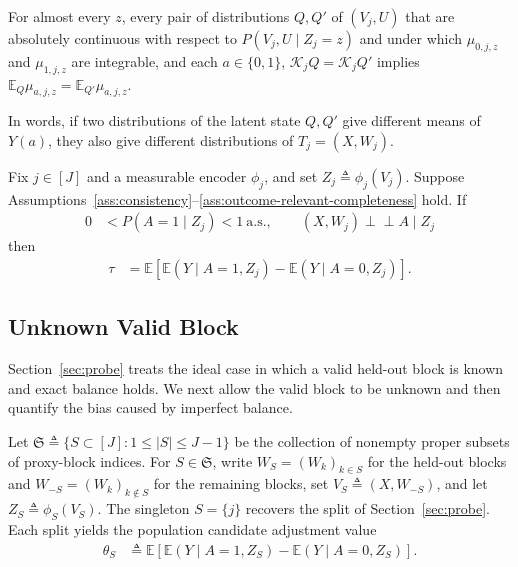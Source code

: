 \begin{assumption}
\label{ass:outcome-relevant-completeness}
For almost every $z$, every pair of distributions $Q,Q'$ of $(V_j,U)$ that are absolutely continuous with respect to $P(V_j,U\mid Z_j=z)$ and under which $\mu_{0,j,z}$ and $\mu_{1,j,z}$ are integrable, and each $a\in\{0,1\}$, $\mathcal K_jQ=\mathcal K_jQ'$ implies $\mathbb E_Q\mu_{a,j,z}=\mathbb E_{Q'}\mu_{a,j,z}$.
\end{assumption}

 In words, if two distributions of the latent state $Q,Q'$ give different means of $Y(a)$, they also give different distributions of $T_j=(X,W_j)$.

\begin{theorem}
\label{thm:exact-proxy-identification}
Fix $j\in[J]$ and a measurable encoder $\phi_j$, and set $Z_j\triangleq\phi_j(V_j)$. Suppose Assumptions~\ref{ass:consistency}--\ref{ass:outcome-relevant-completeness} hold. If
\begin{align}
	0 &< P(A=1\mid Z_j)<1\ \text{a.s.},\qquad (X,W_j)\perp\!\!\!\perp A\mid Z_j
\label{eq:exact-proxy-balance}
\end{align}
then
\begin{align}
\tau &=\mathbb E[\mathbb E(Y\mid A=1,Z_j)-\mathbb E(Y\mid A=0,Z_j)].
\label{eq:exact-identification}
\end{align}
\end{theorem}

\subsection{Unknown Valid Block}
\label{sec:unknown-blocks}

Section~\ref{sec:probe} treats the ideal case in which a valid held-out block is known and exact balance holds. We next allow the valid block to be unknown and then quantify the bias caused by imperfect balance.

Let $\mathfrak S\triangleq\{S\subset[J]:1\le |S|\le J-1\}$ be the collection of nonempty proper subsets of proxy-block indices. For $S\in\mathfrak S$, write $W_S=(W_k)_{k\in S}$ for the held-out blocks and $W_{-S}=(W_k)_{k\notin S}$ for the remaining blocks, set $V_S\triangleq(X,W_{-S})$, and let $Z_S\triangleq\phi_S(V_S)$. The singleton $S=\{j\}$ recovers the split of Section~\ref{sec:probe}. Each split yields the population candidate adjustment value
\begin{align}
\label{eq:block-candidate-adjustment-value}
	\theta_S &\triangleq\mathbb E[\mathbb E(Y\mid A=1,Z_S)-\mathbb E(Y\mid A=0,Z_S)].
\end{align}

